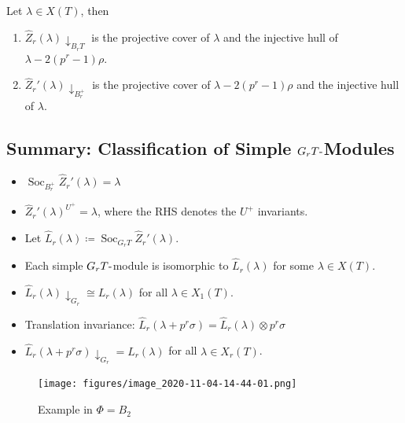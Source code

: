 \begin{proposition}[?]

Let \(\lambda \in X(T)\), then

\begin{enumerate}
\def\labelenumi{\arabic{enumi}.}
\item
  \(\widehat{Z}_r (\lambda) \downarrow_{B_r T}\) is the projective cover
  of \(\lambda\) and the injective hull of \(\lambda - 2(p^r-1)\rho\).
\item
  \(\widehat{Z}_r' (\lambda) \downarrow_{B_r^+}\) is the projective
  cover of \(\lambda - 2(p^r-1)\rho\) and the injective hull of
  \(\lambda\).
\end{enumerate}

\end{proposition}

\hypertarget{summary-classification-of-simple-g_r-thbox-modules}{%
\subsection{\texorpdfstring{Summary: Classification of Simple
\(G_r T{\hbox{-}}\)Modules}{Summary: Classification of Simple G\_r T\{\textbackslash hbox\{-\}\}Modules}}\label{summary-classification-of-simple-g_r-thbox-modules}}

\begin{itemize}
\tightlist
\item
  \(\operatorname{Soc}_{B_r^+} \widehat{Z}_r '(\lambda) = \lambda\)
\item
  \(\widehat{Z}_r ' (\lambda) ^{U^+} = \lambda\), where the RHS denotes
  the \(U^+\) invariants.
\item
  Let
  \(\widehat{L}_r(\lambda) \coloneqq\operatorname{Soc}_{G_r T} \widehat{Z}_r' (\lambda)\).
\item
  Each simple \(G_r T{\hbox{-}}\)module is isomorphic to
  \(\widehat{L}_r (\lambda)\) for some \(\lambda\in X(T)\).
\item
  \(\widehat{L}_r(\lambda) \downarrow_{G_r} \cong L_r (\lambda)\) for
  all \(\lambda \in X_1(T)\).
\item
  Translation invariance:
  \(\widehat{L}_r(\lambda + p^r\sigma) = \widehat{L}_r (\lambda) \otimes p^r\sigma\)
\item
  \(\widehat{L}_r (\lambda + p^r \sigma) \downarrow_{G_r} = L_r(\lambda)\)
  for all \(\lambda \in X_r(T)\).
\end{itemize}

\begin{figure}
\centering
\texttt{[image: figures/image\_2020-11-04-14-44-01.png]}
\caption{Example in \(\Phi = B_2\)}
\end{figure}


